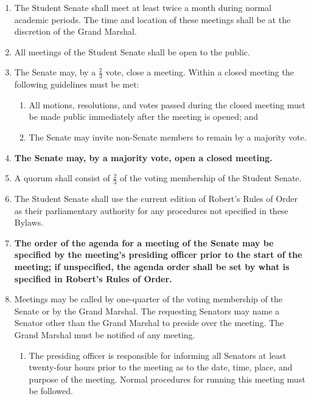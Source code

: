 
\begin{enumerate}

    \item The Student Senate shall meet at least twice a month during normal academic periods. The time and location of these meetings shall be at the discretion of the Grand Marshal.

    \item All meetings of the Student Senate shall be open to the public.

    \item The Senate may, by a $\frac{2}{3}$ vote, close a meeting. Within a closed meeting the following guidelines must be met:
    \begin{enumerate}
        \item All motions, resolutions, and votes passed during the closed meeting must be made public immediately after the meeting is
        opened; and
        \item The Senate may invite non-Senate members to remain by a majority vote.
    \end{enumerate}

    \item \textbf{The Senate may, by a majority vote, open a closed meeting.}

    \item A quorum shall consist of $\frac{2}{3}$ of the voting membership of the Student Senate.

    \item The Student Senate shall use the current edition of Robert’s Rules of Order as their parliamentary authority for any procedures not specified in these Bylaws.

    \item \textbf{The order of the agenda for a meeting of the Senate may be specified by the meeting’s presiding officer prior to the start of the meeting; if unspecified, the agenda order shall be set by what is specified in Robert’s Rules of Order.}

    \item Meetings may be called by one-quarter of the voting membership of the Senate or by the Grand Marshal. The requesting
    Senators may name a Senator other than the Grand Marshal to preside over the meeting. The Grand Marshal must be notified of
    any meeting.
    \begin{enumerate}
        \item The presiding officer is responsible for informing all Senators at least twenty-four hours prior to the meeting as to the date, time, place, and purpose of the meeting. Normal procedures for running this meeting must be followed.
    \end{enumerate}

\end{enumerate}
